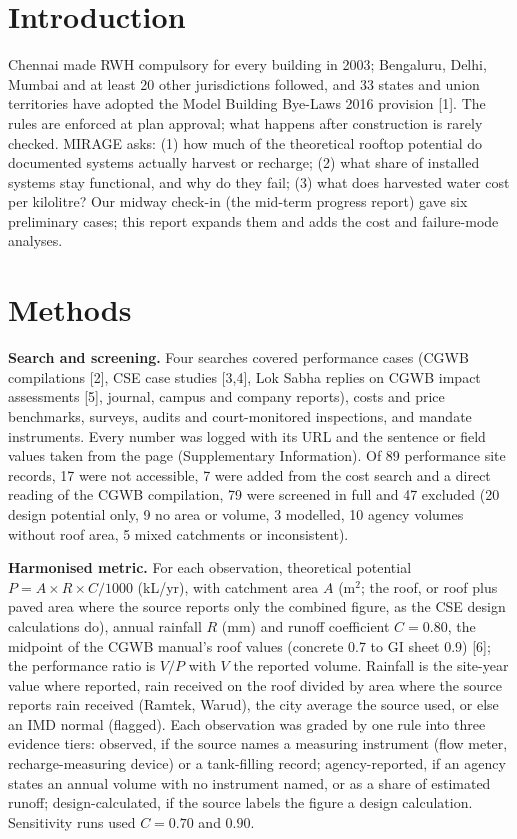 \section{Introduction}
Chennai made RWH compulsory for every building in 2003; Bengaluru, Delhi, Mumbai and at least 20 other jurisdictions followed, and 33 states and union territories have adopted the Model Building Bye-Laws 2016 provision [1].  The rules are enforced at plan approval; what happens after construction is rarely checked. MIRAGE asks: (1) how much of the theoretical rooftop potential do documented systems actually harvest or recharge; (2) what share of installed systems stay functional, and why do they fail; (3) what does harvested water cost per kilolitre? Our midway check-in (the mid-term progress report) gave six preliminary cases; this report expands them and adds the cost and failure-mode analyses.

\section{Methods}
\textbf{Search and screening.} Four searches covered performance cases (CGWB compilations [2], CSE case studies [3,4], Lok Sabha replies on CGWB impact assessments [5], journal, campus and company reports), costs and price benchmarks, surveys, audits and court-monitored inspections, and mandate instruments. Every number was logged with its URL and the sentence or field values taken from the page (Supplementary Information). Of 89 performance site records, 17 were not accessible, 7 were added from the cost search and a direct reading of the CGWB compilation, 79 were screened in full and 47 excluded (20 design potential only, 9 no area or volume, 3 modelled, 10 agency volumes without roof area, 5 mixed catchments or inconsistent).

\textbf{Harmonised metric.} For each observation, theoretical potential $P = A \times R \times C/1000$ (kL/yr), with catchment area $A$ (m$^2$; the roof, or roof plus paved area where the source reports only the combined figure, as the CSE design calculations do), annual rainfall $R$ (mm) and runoff coefficient $C = 0.80$, the midpoint of the CGWB manual's roof values (concrete 0.7 to GI sheet 0.9) [6]; the performance ratio is $V/P$ with $V$ the reported volume. Rainfall is the site-year value where reported, rain received on the roof divided by area where the source reports rain received (Ramtek, Warud), the city average the source used, or else an IMD normal (flagged). Each observation was graded by one rule into three evidence tiers: observed, if the source names a measuring instrument (flow meter, recharge-measuring device) or a tank-filling record; agency-reported, if an agency states an annual volume with no instrument named, or as a share of estimated runoff; design-calculated, if the source labels the figure a design calculation. Sensitivity runs used $C = 0.70$ and $0.90$.

